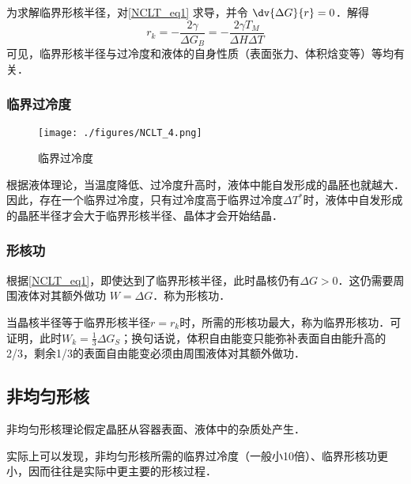 为求解临界形核半径，对\autoref{NCLT_eq1} 求导，并令 $\dv{\Delta G}{r} = 0$．解得
\begin{equation}
r_k=-\frac{2\gamma}{\Delta G_B}=-\frac{2\gamma T_M}{\Delta H \Delta T}
\end{equation}
可见，临界形核半径与过冷度和液体的自身性质（表面张力、体积焓变等）等均有关．

\subsubsection{临界过冷度}

\begin{figure}[ht]
\centering
\texttt{[image: ./figures/NCLT\_4.png]}
\caption{临界过冷度} \label{NCLT_fig4}
\end{figure}
根据液体理论，当温度降低、过冷度升高时，液体中能自发形成的晶胚也就越大．因此，存在一个临界过冷度，只有过冷度高于临界过冷度$\Delta T^*$时，液体中自发形成的晶胚半径才会大于临界形核半径、晶体才会开始结晶．

\subsubsection{形核功}
根据\autoref{NCLT_eq1}，即使达到了临界形核半径，此时晶核仍有$\Delta G>0$．这仍需要周围液体对其额外做功 $W=\Delta G$．称为形核功．

当晶核半径等于临界形核半径$r=r_k$时，所需的形核功最大，称为临界形核功．可证明，此时$W_k=\frac{1}{3}\Delta G_S$；换句话说，体积自由能变只能弥补表面自由能升高的2/3，剩余1/3的表面自由能变必须由周围液体对其额外做功．

\subsection{非均匀形核}
非均匀形核理论假定晶胚从容器表面、液体中的杂质处产生．

实际上可以发现，非均匀形核所需的临界过冷度（一般小10倍）、临界形核功更小，因而往往是实际中更主要的形核过程．

